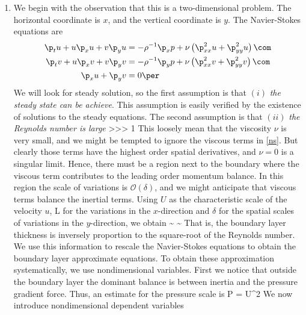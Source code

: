\documentclass[11pt]{article}
\begin{document}
\begin{enumerate}[label=(\alph*)]
    \item We begin with the observation that this is a two-dimensional problem. The horizontal coordinate is $x$, and the vertical coordinate is $y$. The Navier-Stokes equations are
        \begin{align}
            \label{ns}
            \p_t u + u\p_x u + v\p_y u &= -\rho^{-1}\p_x p + \nu  \left(\p^2_{xx}u +\p^2_{yy}u\right)\com\nonumber\\
            \p_t v + u\p_x v + v\p_y v &= -\rho^{-1}\p_y p + \nu  \left(\p^2_{xx}v +\p^2_{yy}v\right)\com\nonumber\\
            \p_x u + \p_y v& = 0\per
        \end{align}
        We will look for steady solution, so the first assumption is that $(i)$ \textit{the steady state can be achieve}. This assumption is easily verified by the existence of solutions to the steady equations. The second assumption is that $(ii)$ \textit{the Reynolds number is large}
        \beq
        \Re {} {} >>> 1\per
        \eeq
        This loosely mean that the viscosity $\nu$ is very small, and we might be tempted to ignore the viscous terms  in \eqref{ns}. But clearly those terms have the highest order spatial derivatives, and $\nu = 0$ is a singular limit. Hence, there must be a region next to the boundary where the viscous term contributes to the leading order momentum balance. In this region the scale of variations is $\mathcal{O(\delta)}$, and we might anticipate that viscous terms balance the inertial terms. Using $U$ as the characteristic scale of the velocity $u$, L for the variations in the $x$-direction and $\delta$ for the spatial scales of variations in the $y$-direction, we obtain
        \beq
        \label{delta}
        \delta \sim {}\com \qquad {} \qquad{} \sim {}\per
        \eeq
    That is, the boundary layer thickness is inversely proportion to the square-root of the Reynolds number. We use this information to rescale the Navier-Stokes equations to obtain the boundary layer approximate equations. To obtain these approximation systematically, we use nondimensional variables. First we notice that outside the boundary layer the dominant balance is between inertia and the pressure gradient force. Thus, an estimate for the pressure scale is
    \beq
    \label{P}
        P = \rho U^2\per
    \eeq
    We now introduce nondimensional dependent variables 
    \beq
    \label{scales}
    \ndu {} {}\com\qquad \ndv {} {}\com\qqand \np {} {}\com

\end{enumerate}
\end{document}
